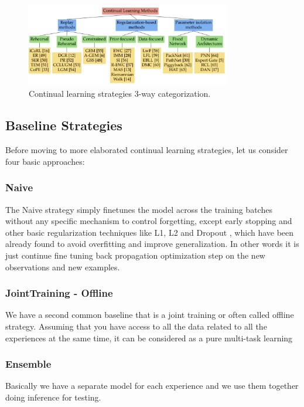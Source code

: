 \documentclass[english, LaM, oneside]{sapthesis}%
\begin{document}
\begin{figure}[!h]
            \centering
            \includegraphics[width=0.8\textwidth]{cl_3strategies.png}
            \caption{Continual learning strategies 3-way categorization.}
            \label{fig:cl_strategies}
        \end{figure}
        
        
\subsection{Baseline Strategies}
Before moving to more elaborated continual learning strategies, let us consider four basic approaches:
\subsubsection{Naive} The Naive strategy simply finetunes the model across the training batches without any specific mechanism to control forgetting, except early stopping and other basic regularization techniques like L1, L2 and Dropout \cite{goodfellow-2013}, which have been already found to avoid overfitting and improve generalization. In other words it is just continue fine tuning back propagation optimization step on the new observations and new examples.
\subsubsection{JointTraining - Offline} We have a second common baseline that is a joint training or often called offline strategy. Assuming that you have access to all the data related to all the experiences at the same time, it can be considered as a pure multi-task learning
\subsubsection{Ensemble} Basically we have a separate model for each experience and we use them together doing inference for testing.
\end{document}
